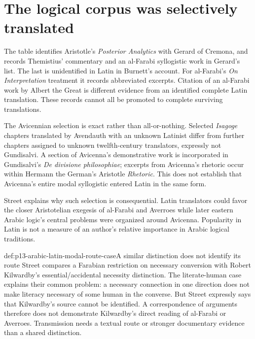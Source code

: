 \section{The logical corpus was selectively translated}
\label{sec:p13-arabic-latin-selected-logic}

The table identifies Aristotle's \emph{Posterior Analytics}
with Gerard of Cremona, and records Themistius' commentary and
an al-Farabi syllogistic work in Gerard's list. The last is
unidentified in Latin in Burnett's account. For al-Farabi's
\emph{On Interpretation} treatment it records abbreviated excerpts.
Citation of an al-Farabi work by Albert the Great is different
evidence from an identified complete Latin translation. These
records cannot all be promoted to complete surviving translations.
\cite[pp.~391--394, 402, notes~28--32]{Burnett2005ArabicLatinSupplement}

The Avicennian selection is exact rather than all-or-nothing.
Selected \emph{Isagoge} chapters translated by Avendauth with
an unknown Latinist differ from further chapters assigned to
unknown twelfth-century translators, expressly not Gundisalvi.
A section of Avicenna's demonstrative work is incorporated in
Gundisalvi's \emph{De divisione philosophiae}; excerpts from
Avicenna's rhetoric occur within Hermann the German's Aristotle
\emph{Rhetoric}. This does not establish that Avicenna's entire
modal syllogistic entered Latin in the same form.
\cite[pp.~394--395, 403, notes~40--41]{Burnett2005ArabicLatinSupplement}

Street explains why such selection is consequential. Latin
translators could favor the closer Aristotelian exegesis of
al-Farabi and Averroes while later eastern Arabic logic's central
problems were organized around Avicenna. Popularity in Latin
is not a measure of an author's relative importance in Arabic
logical traditions.
\cite[pp.~248--249]{Street2005LogicSupplement}

\begin{hbexample}{def:p13-arabic-latin-modal-route-case}{A similar distinction does not identify its route}
Street compares a Farabian restriction on necessary conversion
with Robert Kilwardby's essential/accidental necessity distinction.
The literate-human case explains their common problem: a necessary
connection in one direction does not make literacy necessary of
some human in the converse. But Street expressly says that
Kilwardby's source cannot be identified. A correspondence of
arguments therefore does not demonstrate Kilwardby's direct
reading of al-Farabi or Averroes. Transmission needs a textual
route or stronger documentary evidence than a shared distinction.
\cite[pp.~257--258]{Street2005LogicSupplement}
\end{hbexample}

